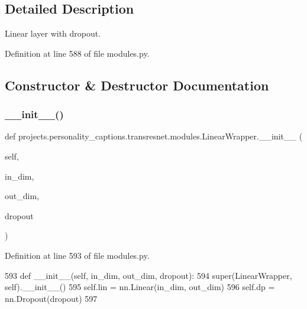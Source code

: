 \subsection{Detailed Description}
\begin{DoxyVerb}Linear layer with dropout.
\end{DoxyVerb}
 

Definition at line 588 of file modules.\+py.



\subsection{Constructor \& Destructor Documentation}
\mbox{\label{classprojects_1_1personality__captions_1_1transresnet_1_1modules_1_1LinearWrapper_a2e10c4bb01e3df60871dc6b0ac5c88a7}} 
\subsubsection{\texorpdfstring{\+\_\+\+\_\+init\+\_\+\+\_\+()}{\_\_init\_\_()}}
{\footnotesize\ttfamily def projects.\+personality\+\_\+captions.\+transresnet.\+modules.\+Linear\+Wrapper.\+\_\+\+\_\+init\+\_\+\+\_\+ (\begin{DoxyParamCaption}\item[{}]{self,  }\item[{}]{in\+\_\+dim,  }\item[{}]{out\+\_\+dim,  }\item[{}]{dropout }\end{DoxyParamCaption})}



Definition at line 593 of file modules.\+py.


\begin{DoxyCode}
593     \textcolor{keyword}{def }\_\_init\_\_(self, in\_dim, out\_dim, dropout):
594         super(LinearWrapper, self).\_\_init\_\_()
595         self.lin = nn.Linear(in\_dim, out\_dim)
596         self.dp = nn.Dropout(dropout)
597 
\end{DoxyCode}


